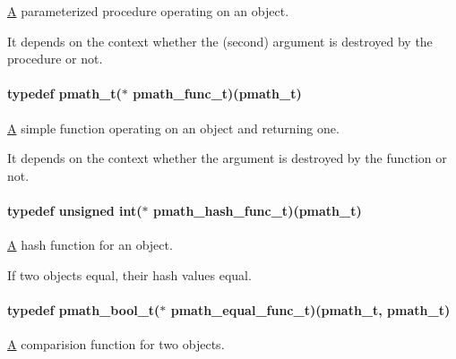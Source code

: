 \hyperlink{class_a}{A} parameterized procedure operating on an object. 

It depends on the context whether the (second) argument is destroyed by the procedure or not. \hypertarget{group__objects_g9dd57b578f42f0556a7d1c1709f97847}{
\paragraph[{pmath\_\-func\_\-t}]{\setlength{\rightskip}{0pt plus 5cm}typedef {\bf pmath\_\-t}($\ast$ {\bf pmath\_\-func\_\-t})({\bf pmath\_\-t})}\hfill}
\label{group__objects_g9dd57b578f42f0556a7d1c1709f97847}


\hyperlink{class_a}{A} simple function operating on an object and returning one. 

It depends on the context whether the argument is destroyed by the function or not. \hypertarget{group__objects_gf7afa773c11a686f6abd7586e0a6a33d}{
\paragraph[{pmath\_\-hash\_\-func\_\-t}]{\setlength{\rightskip}{0pt plus 5cm}typedef unsigned int($\ast$ {\bf pmath\_\-hash\_\-func\_\-t})({\bf pmath\_\-t})}\hfill}
\label{group__objects_gf7afa773c11a686f6abd7586e0a6a33d}


\hyperlink{class_a}{A} hash function for an object. 

If two objects equal, their hash values equal. \hypertarget{group__objects_g3596be6b7da718f547985fdde3d8edd1}{
\paragraph[{pmath\_\-equal\_\-func\_\-t}]{\setlength{\rightskip}{0pt plus 5cm}typedef {\bf pmath\_\-bool\_\-t}($\ast$ {\bf pmath\_\-equal\_\-func\_\-t})({\bf pmath\_\-t}, {\bf pmath\_\-t})}\hfill}
\label{group__objects_g3596be6b7da718f547985fdde3d8edd1}


\hyperlink{class_a}{A} comparision function for two objects. 

